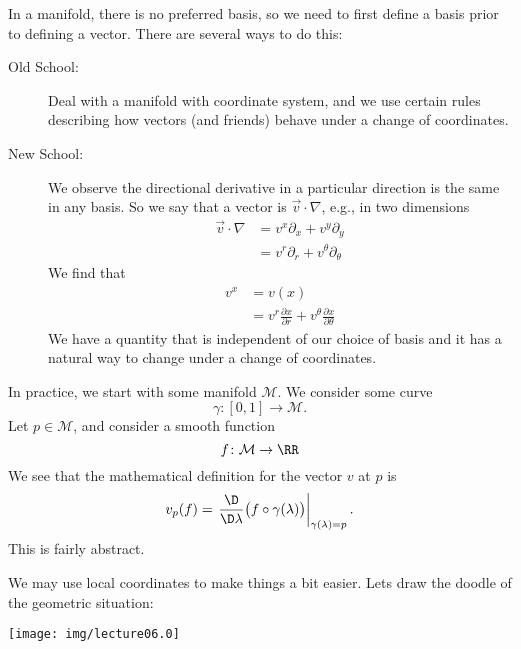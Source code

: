 \medskip
In a manifold, there is no preferred basis, so we need to first
define a basis prior to defining a vector. There are several ways
to do this:
\begin{description}
\item[Old School:]
Deal with a manifold with coordinate system, and we use certain
rules describing how vectors (and friends) behave under a change
of coordinates.
\item[New School:]
We observe the directional derivative in a particular direction
is the same in any basis. So we say that a vector is
$\vec{v}\cdot\nabla$, e.g., in two dimensions
\begin{subequations}
\begin{align}
\vec{v}\cdot\nabla
&=v^{x}\partial_{x}+v^{y}\partial_{y}\\
&=v^{r}\partial_{r}+v^{\theta}\partial_{\theta}
\end{align}
\end{subequations}
We find that 
\begin{equation}
\begin{split}
v^{x}&=v(x)\\
&=v^{r}\frac{\partial x}{\partial r}+v^{\theta}\frac{\partial x}{\partial\theta}
\end{split}
\end{equation}
We have a quantity that is independent of our choice of basis and
it has a natural way to change under a change of coordinates.
\end{description}

In practice, we start with some manifold $\mathcal{M}$. We
consider some curve
\begin{equation}
\gamma\colon[0,1]\to\mathcal{M}.
\end{equation}
Let $p\in\mathcal{M}$, and consider a smooth function
\begin{equation}
f\colon\mathcal{M}\to\RR
\end{equation}
We see that the mathematical definition for the vector $v$ at $p$ is
\begin{equation}
v_{p}(f)=\left.\frac{\D}{\D\lambda}\bigl(f\circ\gamma(\lambda)\bigr)\right|_{\gamma(\lambda)=p}.
\end{equation}
This is fairly abstract.

We may use local coordinates to make things a bit easier. Lets
draw the doodle of the geometric situation:

\begin{center}
  \texttt{[image: img/lecture06.0]}
\end{center}

